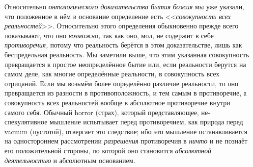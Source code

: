 Относительно {\em онтологического доказательства бытия
божия} мы уже указали, что положенное в нём в основание определение есть
<<{\em совокупность всех реальностей}>>. Относительно
этого определения обыкновенно прежде всего показывают, что оно
{\em возможно,} так как оно, мол, не содержит в себе
{\em противоречия,} потому что реальность берётся в
этом доказательстве, лишь как беспредельная реальность. Мы заметили выше,
что этим указанная совокупность превращается в простое неопределённое бытие
или, если реальности берутся на самом деле, как многие определённые
реальности, в совокупность всех отрицаний. Если мы возьмём более
определённо различие реальности, то оно превращается из разности в
противоположность, и тем самым в противоречие, а совокупность всех
реальностей вообще в абсолютное противоречие внутри самого себя. Обычный
horror (страх), который представляющее, не-спекулятивное мышление
испытывает перед противоречием, как природа перед vacuum (пустотой),
отвергает это следствие; ибо это мышление останавливается на одностороннем
рассмотрении {\em разрешения} противоречия в
{\em ничто} и не познаёт его положительной стороны, по
которой оно становится {\em абсолютной деятельностью} и
абсолютным основанием.

